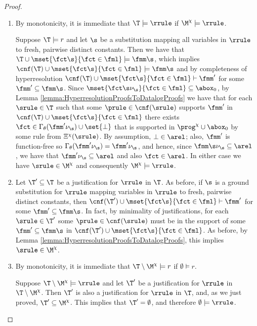 \begin{proof}\ 

\begin{enumerate}
\item By monotonicity, it is immediate that $\T\models \rrule$ if $\M^{\chi}\models \rrule$.

Suppose $\T\models r$ and 
let $\s$ be a substitution mapping all variables in $\rrule$ to fresh, pairwise 
distinct constants. Then we have that $\T\cup\mset{\fct\s}{\fct\in\fml}\models \fmm\s$, which
implies $\cnf(\T)\cup\mset{\fct\s}{\fct\in\fml}\models \fmm\s$ and by
completeness of hyperresolution $\cnf(\T)\cup\mset{\fct\s}{\fct\in\fml}\vdash\fmm'$
for some $\fmm'\subseteq\fmm\s$.
Since $\mset{\fct\s\nu_{\s}}{\fct\in\fml}\subseteq \abox_0$, 
by Lemma \ref{lemma:HyperresolutionProofsToDatalogProofs} we have that for each 
$\srule\in\T$ such that some $\prule\in\cnf(\srule)$ supports 
$\fmm'$ in $\cnf(\T)\cup\mset{\fct\s}{\fct\in\fml}$
there exists $\fct\in\Gamma_{\theta}(\fmm'\nu_{\s})\cup\set{\bot}$
that is supported in $\prog^{\chi}\cup\abox_0$ by some rule from $\Xi^{\chi}(\srule)$.
By assumption, $\bot\in\arel$; also, $\fmm'$ is function-free so 
$\Gamma_{\theta}(\fmm'\nu_{\s}) = \fmm'\nu_{\s}$, and hence,
since $\fmm\s\nu_{\s}\subseteq \arel$, 
we have that $\fmm'\nu_{\s}\subseteq \arel$ and also $\fct\in\arel$.
In either case we have $\srule\in\M^{\chi}$ and consequently $\M^{\chi}\models \rrule$.

\item Let $\T'\subseteq \T$ be a justification for $\rrule$ in $\T$. 
As before, if $\s$ is a ground substitution for $\rrule$ mapping variables in $\rrule$ to fresh, 
pairwise distinct constants, then 
$\cnf(\T')\cup\mset{\fct\s}{\fct\in\fml}\vdash\fmm'$ 
for some $\fmm'\subseteq\fmm\s$.
In fact, by minimality of justifications, for each $\srule\in\T'$ some 
$\prule\in \cnf(\srule)$ must be in the support of 
some $\fmm'\subseteq \fmm\s$
in $\cnf(\T')\cup \mset{\fct\s}{\fct\in\fml}$.
As before, by Lemma \ref{lemma:HyperresolutionProofsToDatalogProofs}, this implies
$\srule\in\M^{\chi}$.

\item By monotonicity, it is immediate that 
$\T\setminus \M^{\chi}\models r$ if $\emptyset\models r$.

Suppose $\T\setminus\M^{\chi}\models \rrule$ and let $\T'$ be a justification for $\rrule$ in 
$\T\setminus\M^{\chi}$. Then $\T'$ is also a justification for $\rrule$ in $\T$, and, as we just 
proved, $\T'\subseteq \M^{\chi}$. This implies that $\T' = \emptyset$, and therefore
$\emptyset\models \rrule$.\qedhere
\end{enumerate}
\end{proof}


